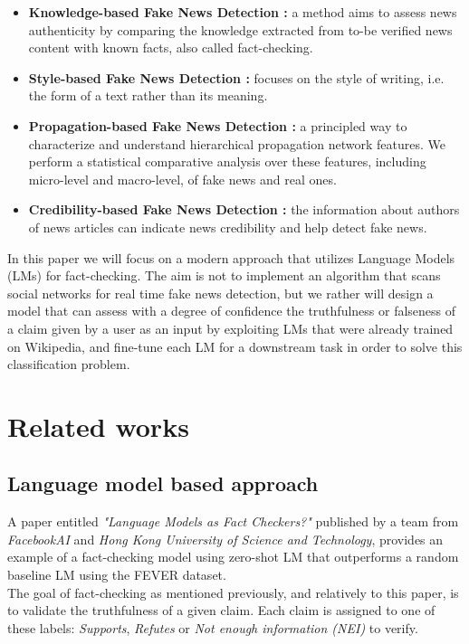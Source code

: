 \documentclass[conference]{IEEEtran}
\begin{document}
\begin{itemize}
\item \textbf{Knowledge-based Fake News Detection \cite{chernyavskiy2021whatthewikifact}:} a method aims to assess news authenticity by comparing the knowledge extracted from to-be verified news content with known facts, also called fact-checking.
\item \textbf{Style-based Fake News Detection \cite{przybyla2020capturing}:} focuses on the style of writing, i.e. the form of a text rather than its meaning.
\item \textbf{Propagation-based Fake News Detection \cite{shu2020hierarchical}:} a principled way to characterize and understand hierarchical propagation network features. We perform a statistical comparative analysis over these features, including micro-level and macro-level, of fake news and real ones.
\item \textbf{Credibility-based Fake News Detection \cite{sitaula2020credibility}:} the information about authors of news articles can indicate news credibility and help detect fake news.
\end{itemize}

In this paper we will focus on a modern approach that utilizes Language Models (LMs) for fact-checking. The aim is not to implement an algorithm that scans social networks for real time fake news detection, but we rather will design a model that can assess with a degree of confidence the truthfulness or falseness of a claim given by a user as an input by exploiting LMs that were already trained on Wikipedia, and fine-tune each LM for a downstream task in order to solve this classification problem.

\section{Related works}
\subsection{Language model based approach \cite{lee2020language} \cite{petroni2019language}}
A paper entitled \textit{"Language Models as Fact Checkers?"} published by a team from \textit{FacebookAI} and \textit{Hong Kong University of Science and Technology}, provides an example of a fact-checking model using zero-shot LM that outperforms a random baseline LM using the FEVER dataset\cite{thorne2018fever}.\\

The goal of fact-checking as mentioned previously, and relatively to this paper, is to validate the truthfulness of a given claim. Each claim is assigned to one of these labels: \textit{Supports}, \textit{Refutes} or \textit{Not enough information (NEI)} to verify.\\
\end{document}
